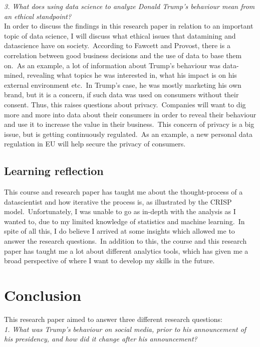 \documentclass[12pt]{article}
\begin{document}
\textit{3. What does using data science to analyze Donald Trump's behaviour mean from an ethical standpoint?}\\

 In order to discuss the findings in this research paper in relation to an important topic of data science, I will discuss what ethical issues that datamining and datascience have on society.\ According to Fawcett and Provost, there is a correlation between good business decisions and the use of data to base them on.\ As an example, a lot of information about Trump's behaviour was data-mined, revealing what topics he was interested in, what his impact is on his external environment etc.\ In Trump's case, he was mostly marketing his own brand, but it is a concern, if such data was used on consumers without their consent. Thus, this raises questions about privacy.\ Companies will want to dig more and more into data about their consumers in order to reveal their behaviour and use it to increase the value in their business.\ This concern of privacy is a big issue, but is getting continuously regulated.\ As an example, a new personal data regulation in EU will help secure the privacy of consumers. \citep{protect}

\subsection{Learning reflection}
This course and research paper has taught me about the thought-process of a datascientist and how iterative the process is, as illustrated by the CRISP model.\ Unfortunately, I was unable to go as in-depth with the analysis as I wanted to, due to my limited knowledge of statistics and machine learning.\ In spite of all this, I do believe I arrived at some insights which allowed me to answer the research questions.\ In addition to this, the course and this research paper has taught me a lot about different analytics tools, which has given me a broad perspective of where I want to develop my skills in the future.\ 


\section{Conclusion}
This research paper aimed to answer three different research questions: \\

\textit{1. What was Trump's behaviour on social media, prior to his announcement of his presidency, and how did it change after his announcement?}\\
\end{document}
